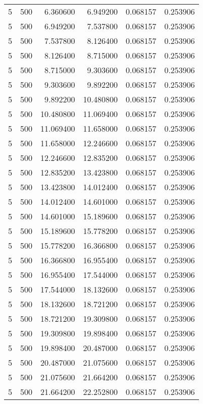 \begin{longtable}{rrrrrr}
5 & 500 & 6.360600 & 6.949200 & 0.068157 & 0.253906 \\
5 & 500 & 6.949200 & 7.537800 & 0.068157 & 0.253906 \\
5 & 500 & 7.537800 & 8.126400 & 0.068157 & 0.253906 \\
5 & 500 & 8.126400 & 8.715000 & 0.068157 & 0.253906 \\
5 & 500 & 8.715000 & 9.303600 & 0.068157 & 0.253906 \\
5 & 500 & 9.303600 & 9.892200 & 0.068157 & 0.253906 \\
5 & 500 & 9.892200 & 10.480800 & 0.068157 & 0.253906 \\
5 & 500 & 10.480800 & 11.069400 & 0.068157 & 0.253906 \\
5 & 500 & 11.069400 & 11.658000 & 0.068157 & 0.253906 \\
5 & 500 & 11.658000 & 12.246600 & 0.068157 & 0.253906 \\
5 & 500 & 12.246600 & 12.835200 & 0.068157 & 0.253906 \\
5 & 500 & 12.835200 & 13.423800 & 0.068157 & 0.253906 \\
5 & 500 & 13.423800 & 14.012400 & 0.068157 & 0.253906 \\
5 & 500 & 14.012400 & 14.601000 & 0.068157 & 0.253906 \\
5 & 500 & 14.601000 & 15.189600 & 0.068157 & 0.253906 \\
5 & 500 & 15.189600 & 15.778200 & 0.068157 & 0.253906 \\
5 & 500 & 15.778200 & 16.366800 & 0.068157 & 0.253906 \\
5 & 500 & 16.366800 & 16.955400 & 0.068157 & 0.253906 \\
5 & 500 & 16.955400 & 17.544000 & 0.068157 & 0.253906 \\
5 & 500 & 17.544000 & 18.132600 & 0.068157 & 0.253906 \\
5 & 500 & 18.132600 & 18.721200 & 0.068157 & 0.253906 \\
5 & 500 & 18.721200 & 19.309800 & 0.068157 & 0.253906 \\
5 & 500 & 19.309800 & 19.898400 & 0.068157 & 0.253906 \\
5 & 500 & 19.898400 & 20.487000 & 0.068157 & 0.253906 \\
5 & 500 & 20.487000 & 21.075600 & 0.068157 & 0.253906 \\
5 & 500 & 21.075600 & 21.664200 & 0.068157 & 0.253906 \\
5 & 500 & 21.664200 & 22.252800 & 0.068157 & 0.253906 \\

\end{longtable}
